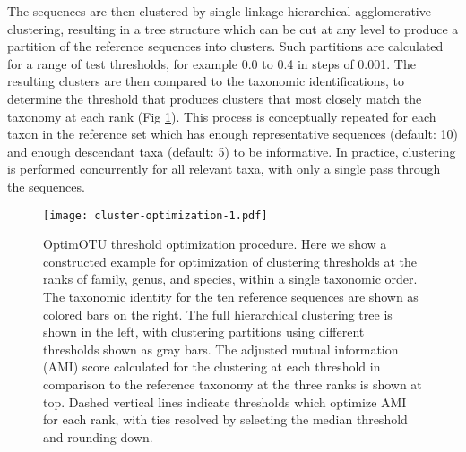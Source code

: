 \documentclass[
]{article}
\begin{document}
The sequences are then clustered by single-linkage hierarchical agglomerative clustering, resulting in a tree structure which can be cut at any level to produce a partition of the reference sequences into clusters.
Such partitions are calculated for a range of test thresholds, for example 0.0 to 0.4 in steps of 0.001.
The resulting clusters are then compared to the taxonomic identifications, to determine the threshold that produces clusters that most closely match the taxonomy at each rank (Fig \ref{fig:cluster-optimization}).
This process is conceptually repeated for each taxon in the reference set which has enough representative sequences (default: 10) and enough descendant taxa (default: 5) to be informative.
In practice, clustering is performed concurrently for all relevant taxa, with only a single pass through the sequences.








\begin{figure}
\centering
\texttt{[image: cluster-optimization-1.pdf]}
\caption{\label{fig:cluster-optimization}OptimOTU threshold optimization procedure.
Here we show a constructed example for optimization of clustering thresholds at the ranks of family, genus, and species, within a single taxonomic order.
The taxonomic identity for the ten reference sequences are shown as colored bars on the right.
The full hierarchical clustering tree is shown in the left, with clustering partitions using different thresholds shown as gray bars.
The adjusted mutual information (AMI) score calculated for the clustering at each threshold in comparison to the reference taxonomy at the three ranks is shown at top.
Dashed vertical lines indicate thresholds which optimize AMI for each rank, with ties resolved by selecting the median threshold and rounding down.}
\end{figure}
\end{document}

